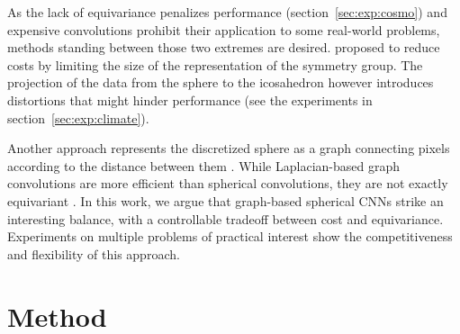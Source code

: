 \documentclass{article} %
\newcommand{\todo}[1]{{\color[rgb]{.6,.1,.6}{#1}}}
\newcommand{\secref}[1]{section~\ref{sec:#1}}
\begin{document}
As the lack of equivariance penalizes performance (\secref{exp:cosmo}) and expensive convolutions prohibit their application to some real-world problems, methods standing between those two extremes are desired.
\citet{cohen2019gauge} proposed to reduce costs by limiting the size of the representation of the symmetry group.
\todo{not all rotations, subset of SO(3)?}
The projection of the data from the sphere to the icosahedron however introduces distortions that might hinder performance (see the experiments in \secref{exp:climate}).
\todo{Where does Jiang fit? Need a global coordinate system (ok for planets, not projections like cosmo)}

Another approach represents the discretized sphere as a graph connecting pixels according to the distance between them \citep{bruna2013gnn, khasanova2017sphericalcnn, perraudin2019deepspherecosmo}.
While Laplacian-based graph convolutions are more efficient than spherical convolutions, they are not exactly equivariant \citep{defferrard2019deepsphereequiv}.
In this work, we argue that graph-based spherical CNNs strike an interesting balance, with a controllable tradeoff between cost and equivariance.
Experiments on multiple problems of practical interest show the competitiveness and flexibility of this approach.

\section{Method}

\end{document}
